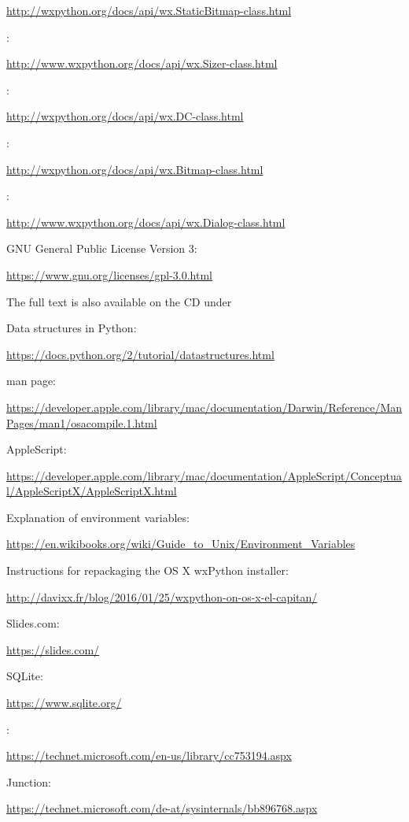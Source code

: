 \documentclass[12pt,a4paper,naustrian,english,oneside,openright,DIV=12,BCOR=1cm]{scrbook}
\begin{document}
\begin{thebibliography}{999}
	\url{http://wxpython.org/docs/api/wx.StaticBitmap-class.html}
	
	 :
	
	\url{http://www.wxpython.org/docs/api/wx.Sizer-class.html}
	
	 :
	
	\url{http://wxpython.org/docs/api/wx.DC-class.html}
	
	 :
	
	\url{http://wxpython.org/docs/api/wx.Bitmap-class.html}
	
	 :
	
	\url{http://www.wxpython.org/docs/api/wx.Dialog-class.html}
	
	 GNU General Public License Version 3:
	
	\url{https://www.gnu.org/licenses/gpl-3.0.html}
	
	
	The full text is also available on the CD under 
	
	 Data structures in Python:
	
	\url{https://docs.python.org/2/tutorial/datastructures.html}
	
	  man page:
	
	\url{https://developer.apple.com/library/mac/documentation/Darwin/Reference/ManPages/man1/osacompile.1.html}
	
	 AppleScript: 
	
	\url{https://developer.apple.com/library/mac/documentation/AppleScript/Conceptual/AppleScriptX/AppleScriptX.html}
	
	 Explanation of environment variables:  
	
	\url{https://en.wikibooks.org/wiki/Guide_to_Unix/Environment_Variables}
	
	 Instructions for repackaging the OS X wxPython installer:
	
	\url{http://davixx.fr/blog/2016/01/25/wxpython-on-os-x-el-capitan/}
	
	 Slides.com:
	
	\url{https://slides.com/}
	
	 SQLite:
	
	\url{https://www.sqlite.org/}
	
	 :
	
	\url{https://technet.microsoft.com/en-us/library/cc753194.aspx}
	
	 Junction:
	
	\url{https://technet.microsoft.com/de-at/sysinternals/bb896768.aspx}
	
\end{thebibliography}
\end{document}
